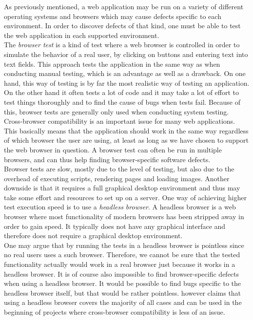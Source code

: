 As previously mentioned, a web application may be run on a variety of
different operating systems and browsers which may cause defects
specific to each environment. In order to discover defects of that kind,
one must be able to test the web application in each supported
environment.\\

The \emph{browser test} is a kind of test where a web browser is
controlled in order to simulate the behavior of a real user, by clicking
on buttons and entering text into text fields. This approach tests the
application in the same way as when conducting manual testing, which is
an advantage as well as a drawback. On one hand, this way of testing is
by far the most realistic way of testing an application. On the other
hand it often tests a lot of code and it may take a lot of effort to
test things thoroughly and to find the cause of bugs when tests fail.
Because of this, browser tests are generally only used when conducting
system testing.\\

Cross-browser compatibility is an important issue for many web
applications. This basically means that the application should work in
the same way regardless of which browser the user are using, at least as
long as we have chosen to support the web browser in question. A browser
test can often be run in multiple browsers, and can thus help finding
browser-specific software defects.\\

Browser tests are slow, mostly due to the level of testing, but also due
to the overhead of executing scripts, rendering pages and loading
images. Another downside is that it requires a full graphical desktop
environment and thus may take some effort and resources to set up on a
server. One way of achieving higher test execution speed is to use a
\emph{headless browser}. A headless browser is a web browser where most
functionality of modern browsers has been stripped away in order to gain
speed. It typically does not have any graphical interface and therefore
does not require a graphical desktop environment. \cite{web:headless}\\

One may argue that by running the tests in a headless browser is
pointless since no real users uses a such browser. Therefore, we cannot
be sure that the tested functionality actually would work in a real
browser just because it works in a headless browser. It is of course
also impossible to find browser-specific defects when using a headless
browser. It would be possible to find bugs specific to the headless
browser itself, but that would be rather pointless. \citet{web:headless}
however claims that using a headless browser covers the majority of all
cases and can be used in the beginning of projects where cross-browser
compatibility is less of an issue.\\


